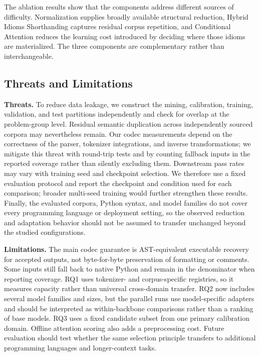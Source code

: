 The ablation results show that the components address different sources of difficulty. Normalization supplies broadly available structural reduction, Hybrid Idioms Shorthanding captures residual corpus repetition, and Conditional Attention reduces the learning cost introduced by deciding where those idioms are materialized. The three components are complementary rather than interchangeable.


\subsection{Threats and Limitations}

\hspace*{\parindent}\textbf{Threats.} To reduce data leakage, we construct the mining,
calibration, training, validation, and test partitions independently and check
for overlap at the problem-group level. Residual semantic duplication across
independently sourced corpora may nevertheless remain. Our codec measurements
depend on the correctness of the parser, tokenizer integrations, and inverse
transformations; we mitigate this threat with round-trip tests and by counting
fallback inputs in the reported coverage rather than silently excluding them.
Downstream pass rates may vary with training seed and checkpoint selection. We
therefore use a fixed evaluation protocol and report the checkpoint and
condition used for each comparison; broader multi-seed training would further
strengthen these results. Finally, the evaluated corpora, Python syntax, and
model families do not cover every programming language or deployment setting,
so the observed reduction and adaptation behavior should not be assumed to
transfer unchanged beyond the studied configurations.

\indent\textbf{Limitations.} The main codec guarantee is AST-equivalent executable recovery for accepted outputs, not byte-for-byte preservation of formatting or comments. Some inputs still fall back to native Python and remain in the denominator when reporting coverage. RQ1 uses tokenizer- and corpus-specific registries, so it measures capacity rather than universal cross-domain transfer. RQ2 now includes several model families and sizes, but the parallel runs use model-specific adapters and should be interpreted as within-backbone comparisons rather than a ranking of base models. RQ3 uses a fixed candidate subset from one primary calibration domain. Offline attention scoring also adds a preprocessing cost. Future evaluation should test whether the same selection principle transfers to additional programming languages and longer-context tasks.
